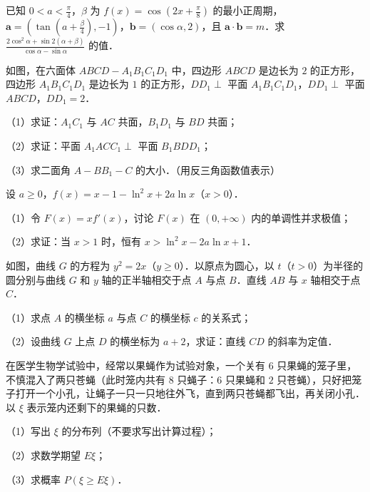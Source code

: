\begin{question}
已知 $0<a<\frac{\pi}{4}$，$\beta$ 为 $f(x)=\cos\left(2x+\frac{\pi}{8}\right)$ 的最小正周期，$\boldsymbol a=\left(\tan\left(a+\frac{\beta}{4}\right),-1\right)$，$\boldsymbol b=(\cos\alpha,2)$，且 $\boldsymbol a\cdot\boldsymbol b=m$．求 $\frac{2\cos^2\alpha+\sin2(\alpha+\beta)}{\cos\alpha-\sin\alpha}$ 的值．

\Needspace{0.4\textheight}
\end{question}
\begin{question}
如图，在六面体 $ABCD-A_1B_1C_1D_1$ 中，四边形 $ABCD$ 是边长为 $2$ 的正方形，四边形 $A_1B_1C_1D_1$ 是边长为 $1$ 的正方形，$DD_1\perp$ 平面 $A_1B_1C_1D_1$，$DD_1\perp$ 平面 $ABCD$，$DD_1=2$．

（1）求证：$A_1C_1$ 与 $AC$ 共面，$B_1D_1$ 与 $BD$ 共面；

（2）求证：平面 $A_1ACC_1\perp$ 平面 $B_1BDD_1$；

（3）求二面角 $A-BB_1-C$ 的大小．（用反三角函数值表示）
\nopagebreak[4]
\begin{center}\end{center}
\nopagebreak[4]
\end{question}
\begin{question}
设 $a\geqslant0$，$f(x)=x-1-\ln^2x+2a\ln x$（$x>0$）．

（1）令 $F(x)=xf'(x)$，讨论 $F(x)$ 在 $(0,+\infty)$ 内的单调性并求极值；

（2）求证：当 $x>1$ 时，恒有 $x>\ln^2x-2a\ln x+1$．

\Needspace{0.4\textheight}
\end{question}
\begin{question}
如图，曲线 $G$ 的方程为 $y^2=2x$（$y\geqslant0$）．以原点为圆心，以 $t$（$t>0$）为半径的圆分别与曲线 $G$ 和 $y$ 轴的正半轴相交于点 $A$ 与点 $B$．直线 $AB$ 与 $x$ 轴相交于点 $C$．

（1）求点 $A$ 的横坐标 $a$ 与点 $C$ 的横坐标 $c$ 的关系式；

（2）设曲线 $G$ 上点 $D$ 的横坐标为 $a+2$，求证：直线 $CD$ 的斜率为定值．
\nopagebreak[4]
\begin{center}\end{center}
\nopagebreak[4]
\end{question}
\begin{question}
在医学生物学试验中，经常以果蝇作为试验对象，一个关有 $6$ 只果蝇的笼子里，不慎混入了两只苍蝇（此时笼内共有 $8$ 只蝇子：$6$ 只果蝇和 $2$ 只苍蝇），只好把笼子打开一个小孔，让蝇子一只一只地往外飞，直到两只苍蝇都飞出，再关闭小孔．以 $\xi$ 表示笼内还剩下的果蝇的只数．

（1）写出 $\xi$ 的分布列（不要求写出计算过程）；

（2）求数学期望 $E\xi$；

（3）求概率 $P(\xi\geqslant E\xi)$．

\end{question}
